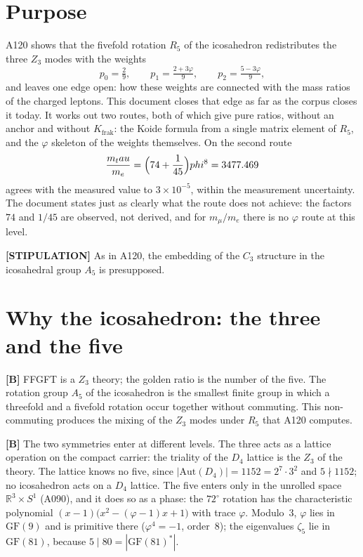\section{Purpose}

A120 shows that the fivefold rotation $R_5$ of the icosahedron redistributes
the three $Z_3$ modes with the weights
\[
  p_0 = \tfrac29,\qquad p_1 = \tfrac{2+3\varphi}{9},\qquad p_2 = \tfrac{5-3\varphi}{9},
\]
and leaves one edge open: how these weights are connected with the mass
ratios of the charged leptons. This document closes that edge as far as the
corpus closes it today. It works out two routes, both of which give pure
ratios, without an anchor and without $K_\text{frak}$: the Koide formula from
a single matrix element of $R_5$, and the $\varphi$ skeleton of the weights
themselves. On the second route
\[
  \frac{m_\tau}{m_e} = \Bigl(74+\frac1{45}\Bigr)\varphi^8 = 3477.469
\]
agrees with the measured value to $3\times10^{-5}$, within the measurement
uncertainty. The document states just as clearly what the route does not
achieve: the factors $74$ and $1/45$ are observed, not derived, and for
$m_\mu/m_e$ there is no $\varphi$ route at this level.

\textbf{[STIPULATION]} As in A120, the embedding of the $C_3$ structure in the
icosahedral group $A_5$ is presupposed.

\section{Why the icosahedron: the three and the five}

\textbf{[B]} FFGFT is a $Z_3$ theory; the golden ratio is the number of the five.
The rotation group $A_5$ of the icosahedron is the smallest finite group in
which a threefold and a fivefold rotation occur together without commuting.
This non-commuting produces the mixing of the $Z_3$ modes under $R_5$ that A120
computes.

\textbf{[B]} The two symmetries enter at different levels. The three acts as a
lattice operation on the compact carrier: the triality of the $D_4$ lattice is
the $Z_3$ of the theory. The lattice knows no five, since
$|\mathrm{Aut}(D_4)| = 1152 = 2^7\cdot3^2$ and $5\nmid1152$; no icosahedron
acts on a $D_4$ lattice. The five enters only in the unrolled space
$\mathbb{R}^3\times S^1$ (A090), and it does so as a phase: the $72^\circ$
rotation has the characteristic polynomial
$(x-1)\bigl(x^2-(\varphi-1)x+1\bigr)$ with trace $\varphi$. Modulo~3,
$\varphi$ lies in $\mathrm{GF}(9)$ and is primitive there ($\varphi^4=-1$,
order~8); the eigenvalues $\zeta_5$ lie in $\mathrm{GF}(81)$, because
$5\mid80=|\mathrm{GF}(81)^*|$.


